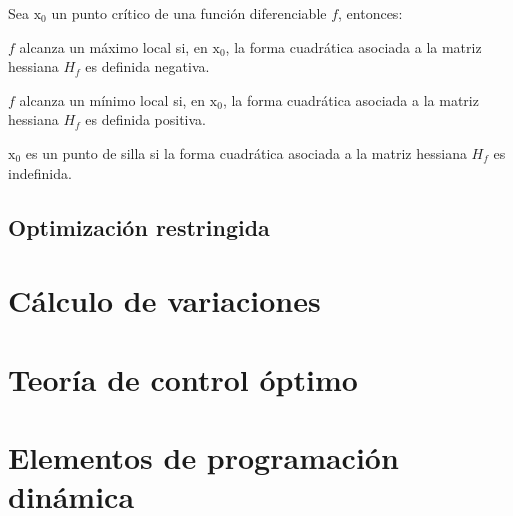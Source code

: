 \documentclass[8pt,a4paper]{extarticle}
\begin{document}
\begin{multicols}{3}
	\begin{boxtheo}
		Sea $\mathrm{x}_0$ un punto crítico de una función diferenciable $f$, entonces:
		\begin{eqlist}
			\item $f$ alcanza un máximo local si, en $\mathrm{x}_0$, la forma cuadrática asociada a la matriz hessiana $H_f$ es definida negativa.
			\item $f$ alcanza un mínimo local si, en $\mathrm{x}_0$, la forma cuadrática asociada a la matriz hessiana $H_f$ es definida positiva.
			\item $\mathrm{x}_0$ es un punto de silla si la forma cuadrática asociada a la matriz hessiana $H_f$ es indefinida.
		\end{eqlist}
	\end{boxtheo}

	\sectionbreak

	\subsection{Optimización restringida}

	\newpage

	\section{Cálculo de variaciones}

	\newpage

	\section{Teoría de control óptimo}

	\newpage

	\section{Elementos de programación dinámica}

	\vfill\eject
	\columnbreak
\end{multicols}
\end{document}
